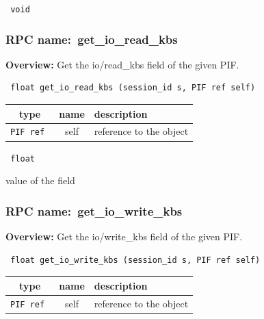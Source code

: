 \vspace{0.3cm}

{\tt 
void
}



\vspace{0.3cm}
\vspace{0.3cm}
\vspace{0.3cm}
\subsubsection{RPC name:~get\_io\_read\_kbs}

{\bf Overview:} 
Get the io/read\_kbs field of the given PIF.

\begin{verbatim} float get_io_read_kbs (session_id s, PIF ref self)\end{verbatim}



 
\vspace{0.3cm}
\begin{tabular}{|c|c|p{7cm}|}
 \hline
{\bf type} & {\bf name} & {\bf description} \\ \hline
{\tt PIF ref } & self & reference to the object \\ \hline 

\end{tabular}

\vspace{0.3cm}

{\tt 
float
}


value of the field
\vspace{0.3cm}
\vspace{0.3cm}
\vspace{0.3cm}
\subsubsection{RPC name:~get\_io\_write\_kbs}

{\bf Overview:} 
Get the io/write\_kbs field of the given PIF.

\begin{verbatim} float get_io_write_kbs (session_id s, PIF ref self)\end{verbatim}



 
\vspace{0.3cm}
\begin{tabular}{|c|c|p{7cm}|}
 \hline
{\bf type} & {\bf name} & {\bf description} \\ \hline
{\tt PIF ref } & self & reference to the object \\ \hline 

\end{tabular}

